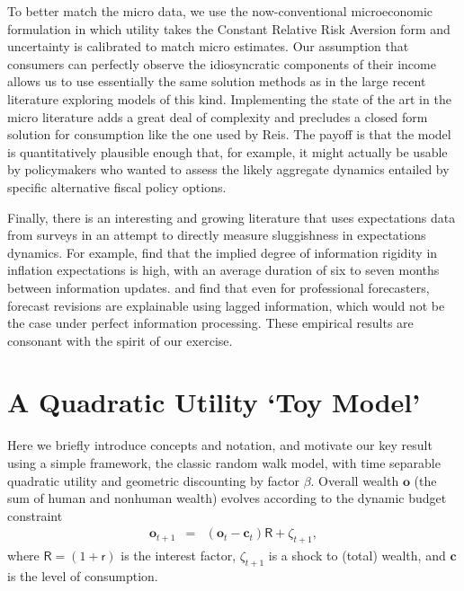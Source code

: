 \documentclass[titlepage]{article}
\begin{document}
To better match the micro data, we use the now-conventional microeconomic formulation in which utility takes the Constant Relative Risk Aversion form and uncertainty is calibrated to match micro estimates.  Our assumption that consumers can perfectly observe the idiosyncratic components of their income allows us to use essentially the same solution methods as in the large recent literature exploring models of this kind.
Implementing the state of the art in the micro literature adds a great deal of complexity and precludes a closed form solution for consumption like the one used by Reis. The payoff is that the model is quantitatively plausible enough that, for example, it might actually be usable by policymakers who wanted to assess the likely aggregate dynamics entailed by specific alternative fiscal policy options.

Finally, there is an interesting and growing literature that uses expectations data from surveys in an attempt to directly measure sluggishness in expectations dynamics.
For example, \cite{coibGor:AER15} find that the implied degree of information rigidity in inflation expectations is high, with an average duration of six to seven months between information updates. \cite{fuhrer:JME17} and \cite{fuhrerIntrinsicPersistence} find that even for professional forecasters, forecast revisions are explainable using lagged information, which would not be the case under perfect information processing.  These empirical results are consonant with the spirit of our exercise.

\section{A Quadratic Utility `Toy Model'}\label{sec:Quadratic}

Here we briefly introduce concepts and notation, and motivate our key result using a simple framework, the classic \cite{hallRandomWalk} random walk model, with time separable quadratic utility and geometric discounting by factor $\beta$.  Overall wealth $\mathbf{o}$ (the sum of human and nonhuman wealth) evolves according to the dynamic budget constraint
\begin{eqnarray}
  \mathbf{o}_{t+1} & = & (\mathbf{o}_{t}-\mathbf{c}_{t})\mathsf{R}+\zeta_{t+1}, \label{eq:zAccum}
\end{eqnarray}
 where $\mathsf{R}=(1+\mathsf{r})$ is the interest factor, $\zeta_{t+1}$ is a shock to (total) wealth, and $\mathbf{c}$ is the level of consumption.
\end{document}
